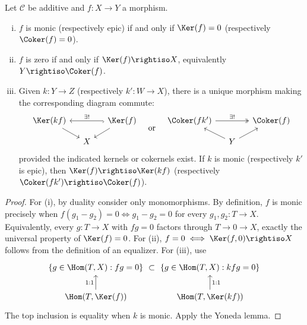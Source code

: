 \begin{lemma}\label{prop:mono-epi-ker-coker}
	Let $\mathcal C$ be additive and $f:X\to Y$ a morphism.
	\begin{enumerate}[(i)]
		\item $f$ is monic (respectively epic) if and only if $\Ker(f)=0$ (respectively $\Coker(f)=0$).
		\item $f$ is zero if and only if $\Ker(f)\rightiso X$, equivalently $Y\rightiso\Coker(f)$.
		\item Given $k:Y\to Z$ (respectively $k':W\to X$), there is a unique morphism making the corresponding diagram commute:
		\[\begin{tikzcd}[row sep=small, column sep=small]
		\Ker(kf) \arrow[rd] & & \Ker(f) \arrow[ld] \arrow[hookrightarrow, ll, "\exists !"'] \\
		& X &
		\end{tikzcd} \quad \text{or} \quad
		\begin{tikzcd}[row sep=small, column sep=small]
		\Coker(fk') \arrow[twoheadrightarrow, rr, "\exists !"] & & \Coker(f) \\
		& Y \arrow[lu] \arrow[ru] &
		\end{tikzcd}\]
		provided the indicated kernels or cokernels exist. If $k$ is monic (respectively $k'$ is epic), then $\Ker(f)\rightiso\Ker(kf)$ (respectively $\Coker(fk')\rightiso\Coker(f)$).
	\end{enumerate}
\end{lemma}

\begin{proof}
	For (i), by duality consider only monomorphisms. By definition, $f$ is monic precisely when $f(g_1-g_2)=0\iff g_1-g_2=0$ for every $g_1,g_2:T\to X$. Equivalently, every $g:T\to X$ with $fg=0$ factors through $T\to0\to X$, exactly the universal property of $\Ker(f)=0$. For (ii), $f=0\iff\Ker(f,0)\rightiso X$ follows from the definition of an equalizer. For (iii), use
	\[\begin{tikzcd}[column sep=small]
		\left\{ g \in \Hom(T, X): fg=0 \right\} \arrow[phantom, r, "\subset" description] & \left\{ g \in \Hom(T, X): kfg=0 \right\} \\
		\Hom(T, \Ker(f)) \arrow[u, "1:1"] & \Hom(T, \Ker(kf)) \arrow[u, "1:1"']
	\end{tikzcd}\]
	The top inclusion is equality when $k$ is monic. Apply the Yoneda lemma.
\end{proof}

